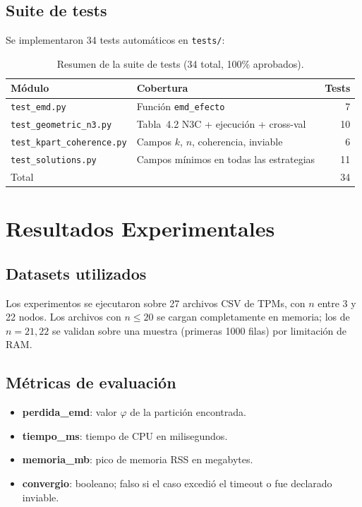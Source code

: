 \documentclass[11pt,letterpaper]{article}
\newcommand{\phi}{\varphi}
\begin{document}
\subsection{Suite de tests}

Se implementaron 34 tests automáticos en \texttt{tests/}:

\begin{table}[H]
  \centering
  \caption{Resumen de la suite de tests (34 total, 100\% aprobados).}
  \begin{tabular}{l l r}
    \toprule
    Módulo & Cobertura & Tests \\
    \midrule
    \texttt{test\_emd.py}            & Función \texttt{emd\_efecto}           & 7 \\
    \texttt{test\_geometric\_n3.py}  & Tabla~4.2 N3C + ejecución + cross-val  & 10 \\
    \texttt{test\_kpart\_coherence.py} & Campos $k$, $n$, coherencia, inviable & 6 \\
    \texttt{test\_solutions.py}      & Campos mínimos en todas las estrategias & 11 \\
    \midrule
    Total & & 34 \\
    \bottomrule
  \end{tabular}
\end{table}

\section{Resultados Experimentales}
\label{sec:resultados}

\subsection{Datasets utilizados}

Los experimentos se ejecutaron sobre 27 archivos CSV de TPMs, con $n$ entre
3 y 22 nodos.  Los archivos con $n \le 20$ se cargan completamente en memoria;
los de $n = 21,22$ se validan sobre una muestra (primeras 1000 filas) por
limitación de RAM.

\subsection{Métricas de evaluación}

\begin{itemize}
  \item \textbf{perdida\_emd}: valor $\phi$ de la partición encontrada.
  \item \textbf{tiempo\_ms}: tiempo de CPU en milisegundos.
  \item \textbf{memoria\_mb}: pico de memoria RSS en megabytes.
  \item \textbf{convergio}: booleano; falso si el caso excedió el timeout o
        fue declarado inviable.
\end{itemize}
\end{document}
